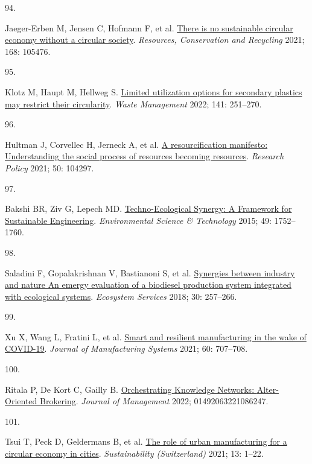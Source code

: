 \documentclass[
  11pt,
  a4paperpaper,
  onecolumn]{article}
\newlength{\cslhangindent}
\newlength{\csllabelwidth}
\newlength{\cslentryspacingunit} %
\newenvironment{CSLReferences}[2] %
 {%
  \setlength{\parindent}{0pt}
  \ifodd #1
  \let\oldpar\par
  \def\par{\hangindent=\cslhangindent\oldpar}
  \fi
  \setlength{\parskip}{#2\cslentryspacingunit}
 }%
 {}
\newcommand{\CSLLeftMargin}[1]{\parbox[t]{\csllabelwidth}{#1}}
\newcommand{\CSLRightInline}[1]{\parbox[t]{\linewidth - \csllabelwidth}{#1}\break}
\begin{document}
\begin{CSLReferences}{0}{0}
\leavevmode{}%
\CSLLeftMargin{94. }%
\CSLRightInline{Jaeger-Erben M, Jensen C, Hofmann F, et al.
\href{https://doi.org/10.1016/j.resconrec.2021.105476}{There is no
sustainable circular economy without a circular society}.
\emph{Resources, Conservation and Recycling} 2021; 168: 105476.}

\leavevmode{}%
\CSLLeftMargin{95. }%
\CSLRightInline{Klotz M, Haupt M, Hellweg S.
\href{https://doi.org/10.1016/J.WASMAN.2022.01.002}{Limited utilization
options for secondary plastics may restrict their circularity}.
\emph{Waste Management} 2022; 141: 251--270.}

\leavevmode{}%
\CSLLeftMargin{96. }%
\CSLRightInline{Hultman J, Corvellec H, Jerneck A, et al.
\href{https://doi.org/10.1016/j.respol.2021.104297}{A resourcification
manifesto: {Understanding} the social process of resources becoming
resources}. \emph{Research Policy} 2021; 50: 104297.}

\leavevmode{}%
\CSLLeftMargin{97. }%
\CSLRightInline{Bakshi BR, Ziv G, Lepech MD.
\href{https://doi.org/10.1021/es5041442}{Techno-{Ecological Synergy}: {A
Framework} for {Sustainable Engineering}}. \emph{Environmental Science
\& Technology} 2015; 49: 1752--1760.}

\leavevmode{}%
\CSLLeftMargin{98. }%
\CSLRightInline{Saladini F, Gopalakrishnan V, Bastianoni S, et al.
\href{https://doi.org/10.1016/j.ecoser.2018.02.004}{Synergies between
industry and nature \textendash{} {An} emergy evaluation of a biodiesel
production system integrated with ecological systems}. \emph{Ecosystem
Services} 2018; 30: 257--266.}

\leavevmode{}%
\CSLLeftMargin{99. }%
\CSLRightInline{Xu X, Wang L, Fratini L, et al.
\href{https://doi.org/10.1016/j.jmsy.2021.07.025}{Smart and resilient
manufacturing in the wake of {COVID-19}}. \emph{Journal of Manufacturing
Systems} 2021; 60: 707--708.}

\leavevmode{}%
\CSLLeftMargin{100. }%
\CSLRightInline{Ritala P, De Kort C, Gailly B.
\href{https://doi.org/10.1177/01492063221086247}{Orchestrating
{Knowledge Networks}: {Alter-Oriented Brokering}}. \emph{Journal of
Management} 2022; 01492063221086247.}

\leavevmode{}%
\CSLLeftMargin{101. }%
\CSLRightInline{Tsui T, Peck D, Geldermans B, et al.
\href{https://doi.org/10.3390/su13010023}{The role of urban
manufacturing for a circular economy in cities}. \emph{Sustainability
(Switzerland)} 2021; 13: 1--22.}


\end{CSLReferences}
\end{document}
